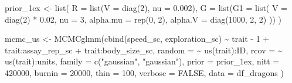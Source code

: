 \documentclass[
  12pt,
]{book}
\newenvironment{Shaded}{\begin{snugshade}}{\end{snugshade}}
\newcommand{\AttributeTok}[1]{\textcolor[rgb]{0.77,0.63,0.00}{#1}}
\newcommand{\ConstantTok}[1]{\textcolor[rgb]{0.00,0.00,0.00}{#1}}
\newcommand{\DecValTok}[1]{\textcolor[rgb]{0.00,0.00,0.81}{#1}}
\newcommand{\FloatTok}[1]{\textcolor[rgb]{0.00,0.00,0.81}{#1}}
\newcommand{\FunctionTok}[1]{\textcolor[rgb]{0.00,0.00,0.00}{#1}}
\newcommand{\NormalTok}[1]{#1}
\newcommand{\OtherTok}[1]{\textcolor[rgb]{0.56,0.35,0.01}{#1}}
\newcommand{\SpecialCharTok}[1]{\textcolor[rgb]{0.00,0.00,0.00}{#1}}
\newcommand{\StringTok}[1]{\textcolor[rgb]{0.31,0.60,0.02}{#1}}
\begin{document}
\begin{Shaded}
\begin{Highlighting}[]
\NormalTok{prior\_1ex }\OtherTok{\textless{}{-}} \FunctionTok{list}\NormalTok{(}
  \AttributeTok{R =} \FunctionTok{list}\NormalTok{(}\AttributeTok{V =} \FunctionTok{diag}\NormalTok{(}\DecValTok{2}\NormalTok{), }\AttributeTok{nu =} \FloatTok{0.002}\NormalTok{),}
  \AttributeTok{G =} \FunctionTok{list}\NormalTok{(}\AttributeTok{G1 =} \FunctionTok{list}\NormalTok{(}
    \AttributeTok{V =} \FunctionTok{diag}\NormalTok{(}\DecValTok{2}\NormalTok{) }\SpecialCharTok{*} \FloatTok{0.02}\NormalTok{, }\AttributeTok{nu =} \DecValTok{3}\NormalTok{,}
    \AttributeTok{alpha.mu =} \FunctionTok{rep}\NormalTok{(}\DecValTok{0}\NormalTok{, }\DecValTok{2}\NormalTok{),}
    \AttributeTok{alpha.V =} \FunctionTok{diag}\NormalTok{(}\DecValTok{1000}\NormalTok{, }\DecValTok{2}\NormalTok{, }\DecValTok{2}\NormalTok{)}
\NormalTok{  ))}
\NormalTok{)}
\end{Highlighting}
\end{Shaded}

\begin{Shaded}
\begin{Highlighting}[]
\NormalTok{mcmc\_us }\OtherTok{\textless{}{-}} \FunctionTok{MCMCglmm}\NormalTok{(}\FunctionTok{cbind}\NormalTok{(speed\_sc, exploration\_sc) }\SpecialCharTok{\textasciitilde{}}\NormalTok{ trait }\SpecialCharTok{{-}} \DecValTok{1} \SpecialCharTok{+}
\NormalTok{    trait}\SpecialCharTok{:}\NormalTok{assay\_rep\_sc }\SpecialCharTok{+}
\NormalTok{    trait}\SpecialCharTok{:}\NormalTok{body\_size\_sc,}
  \AttributeTok{random =} \SpecialCharTok{\textasciitilde{}} \FunctionTok{us}\NormalTok{(trait)}\SpecialCharTok{:}\NormalTok{ID,}
  \AttributeTok{rcov =} \SpecialCharTok{\textasciitilde{}} \FunctionTok{us}\NormalTok{(trait)}\SpecialCharTok{:}\NormalTok{units,}
  \AttributeTok{family =} \FunctionTok{c}\NormalTok{(}\StringTok{"gaussian"}\NormalTok{, }\StringTok{"gaussian"}\NormalTok{),}
  \AttributeTok{prior =}\NormalTok{ prior\_1ex,}
  \AttributeTok{nitt =} \DecValTok{420000}\NormalTok{,}
  \AttributeTok{burnin =} \DecValTok{20000}\NormalTok{,}
  \AttributeTok{thin =} \DecValTok{100}\NormalTok{,}
  \AttributeTok{verbose =} \ConstantTok{FALSE}\NormalTok{,}
  \AttributeTok{data =}\NormalTok{ df\_dragons}
\NormalTok{)}
\end{Highlighting}
\end{Shaded}

\begin{Shaded}
\end{Shaded}
\end{document}
